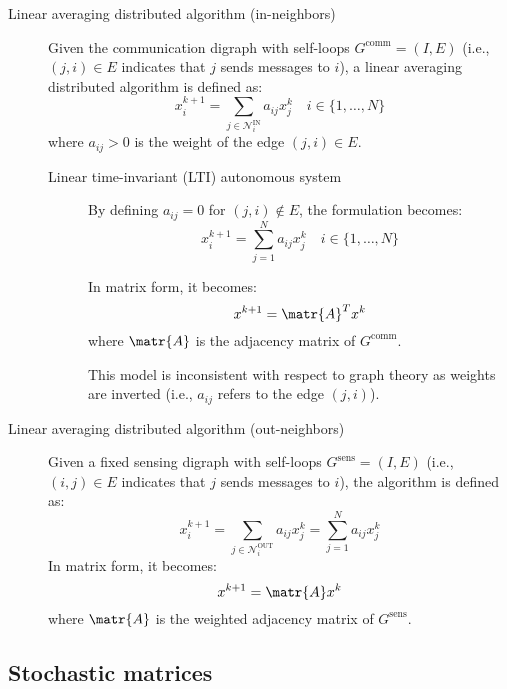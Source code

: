\begin{description}
    \item[Linear averaging distributed algorithm (in-neighbors)] 
        Given the communication digraph with self-loops $G^\text{comm} = (I, E)$ (i.e., $(j, i) \in E$ indicates that $j$ sends messages to $i$), a linear averaging distributed algorithm is defined as:
        \[ x_i^{k+1} = \sum_{j \in \mathcal{N}_i^\text{IN}} a_{ij} x_j^k \quad i \in \{1, \dots, N\} \]
        where $a_{ij} > 0$ is the weight of the edge $(j, i) \in E$.

        \begin{description}
            \item[Linear time-invariant (LTI) autonomous system] 
                By defining $a_{ij} = 0$ for $(j, i) \notin E$, the formulation becomes:
                \[ x_i^{k+1} = \sum_{j=1}^N a_{ij} x_j^k  \quad i \in \{ 1, \dots, N \} \]

                In matrix form, it becomes:
                \[ x^{k+1} = \matr{A}^T x^k \]
                where $\matr{A}$ is the adjacency matrix of $G^\text{comm}$.

                \begin{remark}
                    This model is inconsistent with respect to graph theory as weights are inverted (i.e., $a_{ij}$ refers to the edge $(j, i)$).
                \end{remark}
        \end{description}

    \item[Linear averaging distributed algorithm (out-neighbors)] 
        Given a fixed sensing digraph with self-loops $G^\text{sens} = (I, E)$ (i.e., $(i, j) \in E$ indicates that $j$ sends messages to $i$), the algorithm is defined as:
        \[ x_i^{k+1} = \sum_{j \in \mathcal{N}_i^\text{OUT}} a_{ij} x_j^k = \sum_{j=1}^{N} a_{ij} x_j^k \]
        In matrix form, it becomes:
        \[ x^{k+1} = \matr{A} x^k \]
        where $\matr{A}$ is the weighted adjacency matrix of $G^\text{sens}$.
\end{description}


\subsection{Stochastic matrices}

